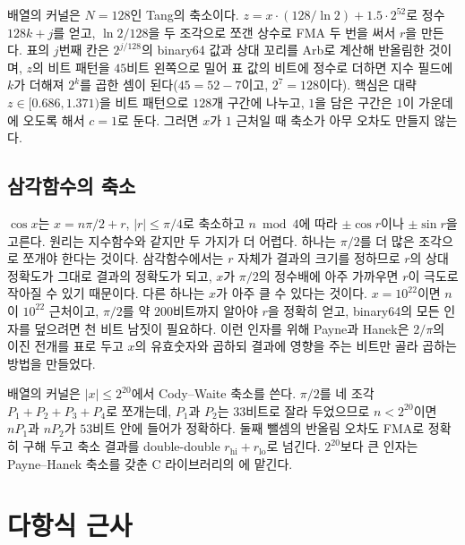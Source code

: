 \begin{instardust}
배열의  커널은 $N=128$인 Tang의 축소이다. $z=x\cdot(128/\ln2)+1.5\cdot2^{52}$로 정수 $128k+j$를 얻고, $\ln2/128$을 두 조각으로 쪼갠 상수로 FMA 두 번을 써서 $r$을 만든다. 표의 $j$번째 칸은 $2^{j/128}$의 binary64 값과 상대 꼬리를 Arb로 계산해 반올림한 것이며, $z$의 비트 패턴을 $45$비트 왼쪽으로 밀어 표 값의 비트에 정수로 더하면 지수 필드에 $k$가 더해져 $2^k$를 곱한 셈이 된다($45=52-7$이고, $2^7=128$이다).  핵심은 대략 $z\in[0.686,1.371)$을 비트 패턴으로 $128$개 구간에 나누고, $1$을 담은 구간은 $1$이 가운데에 오도록 해서 $c=1$로 둔다. 그러면 $x$가 $1$ 근처일 때 축소가 아무 오차도 만들지 않는다.
\end{instardust}

\subsection{삼각함수의 축소}

$\cos x$는 $x=n\pi/2+r$, $|r|\le\pi/4$로 축소하고 $n\bmod4$에 따라 $\pm\cos r$이나 $\pm\sin r$을 고른다. 원리는 지수함수와 같지만 두 가지가 더 어렵다. 하나는 $\pi/2$를 더 많은 조각으로 쪼개야 한다는 것이다. 삼각함수에서는 $r$ 자체가 결과의 크기를 정하므로 $r$의 상대 정확도가 그대로 결과의 정확도가 되고, $x$가 $\pi/2$의 정수배에 아주 가까우면 $r$이 극도로 작아질 수 있기 때문이다. 다른 하나는 $x$가 아주 클 수 있다는 것이다. $x=10^{22}$이면 $n$이 $10^{22}$ 근처이고, $\pi/2$를 약 $200$비트까지 알아야 $r$을 정확히 얻고, binary64의 모든 인자를 덮으려면 천 비트 남짓이 필요하다. 이런 인자를 위해 Payne과 Hanek은 $2/\pi$의 이진 전개를 표로 두고 $x$의 유효숫자와 곱하되 결과에 영향을 주는 비트만 골라 곱하는 방법을 만들었다\cite{payne1983}.

\begin{instardust}
배열의  커널은 $|x|\le2^{20}$에서 Cody--Waite 축소를 쓴다. $\pi/2$를 네 조각 $P_1+P_2+P_3+P_4$로 쪼개는데, $P_1$과 $P_2$는 $33$비트로 잘라 두었으므로 $n<2^{20}$이면 $nP_1$과 $nP_2$가 $53$비트 안에 들어가 정확하다. 둘째 뺄셈의 반올림 오차도 FMA로 정확히 구해 두고 축소 결과를 double-double $r_{\mathrm{hi}}+r_{\mathrm{lo}}$로 넘긴다. $2^{20}$보다 큰 인자는 Payne--Hanek 축소를 갖춘 C 라이브러리의 에 맡긴다.
\end{instardust}

\section{다항식 근사}
\label{sec:poly-approx}

